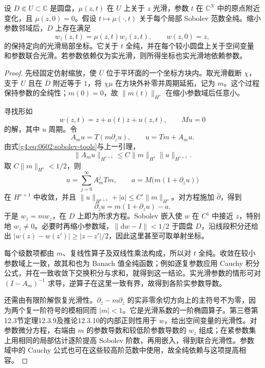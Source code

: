 \begin{theorem}\label{g4:thm:0602:small-beltrami}
	设 \(D\Subset U\subset\mathbb C\) 是圆盘，\(\mu(z,t)\) 在 \(U\) 上关于 \(z\) 光滑，参数 \(t\) 在 \(\mathbb C^N\) 中的原点附近变化，且 \(\mu(z,0)=0\)。假设 \(t\mapsto\mu(\cdot,t)\) 关于每个局部 Sobolev 范数全纯。缩小参数邻域后，\(D\) 上存在满足
	\[
		w_{\overline z}(z,t)=\mu(z,t)w_z(z,t),
		\qquad w(z,0)=z,
	\]
	的保持定向的光滑局部坐标。它关于 \(t\) 全纯，并在每个较小圆盘上关于空间变量和参数联合光滑。若参数依赖仅为实光滑，则所得坐标也实光滑地依赖参数。
\end{theorem}
\begin{proof}
	先经固定仿射缩放，使 \(\overline U\) 位于平环面的一个坐标方块内。取光滑截断 \(\chi\)，支于 \(U\) 且在 \(\overline D\) 附近等于 \(1\)，将 \(\chi\mu\) 在方块外补零并周期延拓，记为 \(m\)。这个过程保持参数的全纯性；\(m(0)=0\)，故 \(\|m(t)\|_{H^s}\) 在缩小参数域后任意小。

	寻找形如
	\[
		w(z,t)=z+a(t)\overline z+u(z,t),\qquad Mu=0
	\]
	的解，其中 \(u\) 周期。令
	\[
		A_m u=T(m\partial_z u),\qquad
		u=T m+A_m u.
	\]
	由式\eqref{g4:eq:0602:sobolev-tools}与上一引理，
	\[
		\|A_m u\|_{H^{s+1}}
		\le C\|m\|_{H^s}\|u\|_{H^{s+1}}.
	\]
	取 \(C\|m\|_{H^s}<1/2\)，则
	\begin{equation}\label{g4:eq:0602:neumann-solution}
		u=\sum_{j=0}^{\infty}A_m^jTm,
		\qquad a=M\bigl(m(1+\partial_z u)\bigr)
	\end{equation}
	在 \(H^{s+1}\) 中收敛，并且 \(\|u\|_{H^{s+1}}+|a|\le C'\|m\|_{H^s}\)。对方程施加 \(\bar\partial\)，得到
	\[
		\partial_{\overline z}u=m(1+\partial_z u)-a.
	\]
	于是 \(w_{\overline z}=m w_z\)，在 \(D\) 上即为所求方程。Sobolev 嵌入使 \(w\) 在 \(C^1\) 中接近 \(z\)，特别地 \(w_z\ne0\)。必要时再缩小参数域，\(\|\mathrm{d}w-I\|<1/2\) 于圆盘 \(D\)，沿线段积分还给出 \(|w(z)-w(z')|\ge|z-z'|/2\)，因此这里甚至可取单射坐标。

	每个级数项都由 \(m\)、复线性算子及双线性乘法构成，所以对 \(t\) 全纯。收敛在较小参数域上一致，故其和也为 Banach 值全纯函数；例如逐复参数应用 Cauchy 积分公式，并在一致收敛下交换积分与求和，就得到这一结论。实光滑参数的情形可对 \((I-A_m)^{-1}\) 求导，逆算子在这里一致有界，故得到各阶实参数导数。

	还需由有限阶解恢复光滑性。\(\partial_{\overline z}-m\partial_z\) 的实非零余切方向上的主符号不为零，因为两个复一阶符号的模相同而 \(|m|<1\)。它是光滑系数的一阶椭圆算子。第三卷第12.3节定理12.3.9及推论12.3.10的内部正则性用于 \(w\)，给出空间变量的光滑性。对参数微分方程，右端由 \(m\) 的参数导数和较低阶参数导数的 \(w_z\) 组成；在紧参数集上用相同的局部估计逐阶提高 Sobolev 阶数，再用嵌入，得到联合光滑性。参数域中的 Cauchy 公式也可在这些较高阶范数中使用，故全纯依赖与这项提高相容。
\end{proof}


